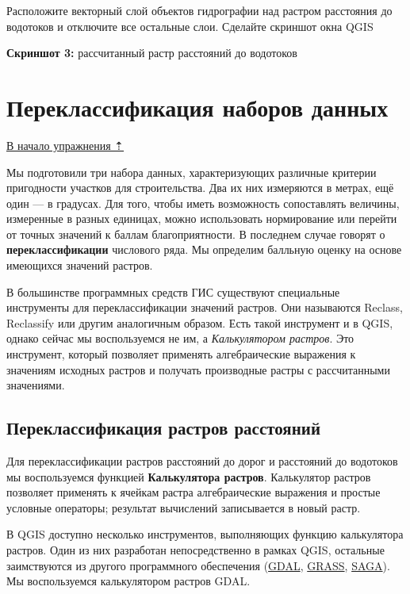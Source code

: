\documentclass[
  12pt,
]{book}
\begin{document}
Расположите векторный слой объектов гидрографии над растром расстояния до водотоков и отключите все остальные слои. Сделайте скриншот окна QGIS

\textbf{Скриншот 3:} рассчитанный растр расстояний до водотоков

\hypertarget{weighted-overlay-reclass}{%
\section{Переклассификация наборов данных}\label{weighted-overlay-reclass}}

\protect\hyperlink{weighted-overlay}{В начало упражнения ⇡}

Мы подготовили три набора данных, характеризующих различные критерии пригодности участков для строительства. Два их них измеряются в метрах, ещё один --- в градусах. Для того, чтобы иметь возможность сопоставлять величины, измеренные в разных единицах, можно использовать нормирование или перейти от точных значений к баллам благоприятности. В последнем случае говорят о \textbf{переклассификации} числового ряда. Мы определим балльную оценку на основе имеющихся значений растров.

В большинстве программных средств ГИС существуют специальные инструменты для переклассификации значений растров. Они называются Reclass, Reclassify или другим аналогичным образом. Есть такой инструмент и в QGIS, однако сейчас мы воспользуемся не им, а \emph{Калькулятором растров}. Это инструмент, который позволяет применять алгебраические выражения к значениям исходных растров и получать производные растры с рассчитанными значениями.

\hypertarget{weighted-overlay-reclass-distance}{%
\subsection{Переклассификация растров расстояний}\label{weighted-overlay-reclass-distance}}

Для переклассификации растров расстояний до дорог и расстояний до водотоков мы воспользуемся функцией \textbf{Калькулятора растров}. Калькулятор растров позволяет применять к ячейкам растра алгебраические выражения и простые условные операторы; результат вычислений записывается в новый растр.

В QGIS доступно несколько инструментов, выполняющих функцию калькулятора растров. Один из них разработан непосредственно в рамках QGIS, остальные заимствуются из другого программного обеспечения (\href{https://gdal.org/}{GDAL}, \href{https://grass.osgeo.org/}{GRASS}, \href{http://www.saga-gis.org/en/index.html}{SAGA}). Мы воспользуемся калькулятором растров GDAL.
\end{document}
